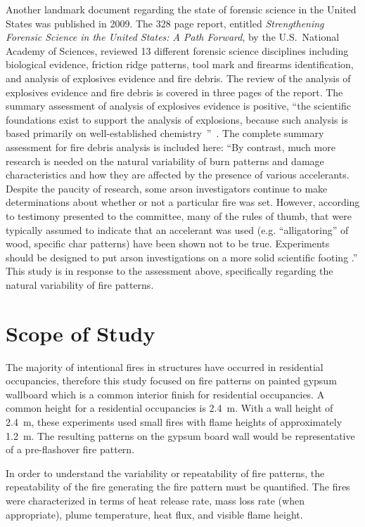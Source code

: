 \documentclass[twoside]{uocthesis}
\begin{document}
Another landmark document regarding the state of forensic science in the United States was published in 2009.  The 328 page report, entitled {\em Strengthening Forensic Science in the United States: A Path Forward}, by the U.S.~National Academy of Sciences, reviewed 13 different forensic science disciplines including biological evidence, friction ridge patterns, tool mark and firearms identification, and analysis of explosives evidence and fire debris.  The review of the analysis of explosives evidence and fire debris is covered in three pages of the report.  The summary assessment of analysis of explosives evidence is positive, ``the scientific foundations exist to support the analysis of explosions, because such analysis is based primarily on well-established chemistry~''~\cite{Forensic:2009}.  The complete summary assessment for fire debris analysis is included here: ``By contrast, much more research is needed on the natural variability of burn patterns and damage characteristics and how they are affected by the presence of various accelerants.  Despite the paucity of research, some arson investigators continue to make determinations about whether or not a particular fire was set.  However, according to testimony presented to the committee, many of the rules of thumb, that were typically assumed to indicate that an accelerant was used (e.g. ``alligatoring'' of wood, specific char patterns) have been shown not to be true.  Experiments should be designed to put arson investigations on a more solid scientific footing .''
This study is in response to the assessment above, specifically regarding the natural variability of fire patterns.


\section{Scope of Study}

The majority of intentional fires in structures have occurred in residential occupancies, therefore this study focused on fire patterns on painted gypsum wallboard which is a common interior finish for residential occupancies.  A common height for a residential occupancies is 2.4~m.  With a wall height of 2.4~m, these experiments used small fires with flame heights of approximately 1.2~m.  The resulting patterns on the gypsum board wall would be representative of a pre-flashover fire pattern.

In order to understand the variability or repeatability of fire patterns, the repeatability of the fire generating the fire pattern must be quantified.  The fires were characterized in terms of heat release rate, mass loss rate (when appropriate), plume temperature, heat flux, and visible flame height.
\end{document}
